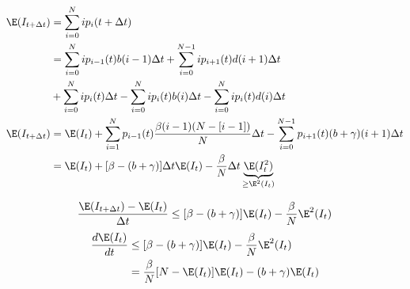 \documentclass[9pt]{beamer}
\begin{document}
    \begin{frame}{}
        \begin{align*}
            \E(I_{t + \Delta t}) &=  
                \sum_{i = 0} ^ N
                    i p_i(t + \Delta t)
            \\  
                        &=
                    \sum_{i = 0} ^ N
                        i p_{i - 1} (t) b(i - 1) \Delta t
                   + \sum_{i = 0} ^ {N-1}
                        i p_{i + 1} (t) d(i + 1) \Delta t
            \\
                & + \sum_{i=0}^N i p_i(t) \Delta t
                - \sum_{i=0}^N i p_i(t) b(i) \Delta t
                - \sum_{i=0}^N i p_i(t) d(i) \Delta t
            \\
                \E(I_{t+ \Delta t}) 
                &= 
                    \E(I_t) 
                        + \sum_{i = 1} ^ N
                        p_{i-1} (t)
                        \frac{\beta (i-1)(N - [i -1])}{N} \Delta t
                        -\sum_{i = 0} ^ {N - 1}
                        p_{i + 1} (t) (b + \gamma) (i+1) \Delta t
            \\
                &=
                \E(I_t) + [\beta - (b + \gamma )] \Delta t \E(I_t)
                -\frac{\beta}{N} \Delta t \underbrace{\E(I_t ^ 2)}_{\geq \E ^2(I_t)}
            \end{align*}

            \begin{equation*}
                \frac{\E(I_{t + \Delta t}) - \E(I_t)}{\Delta t}
                    \leq
                        [\beta  - (b + \gamma)] \E (I_t)
                        - \frac{\beta}{N} \E^2 (I_t)
            \end{equation*}
            \begin{align*}
                \frac{d \E(I_{t})}{dt}
                    & \leq
                        [\beta  - (b + \gamma)] \E (I_t)
                        - \frac{\beta}{N} \E ^ 2 (I_t)
                \\
                    & = \frac{\beta}{N} [N - \E(I_t)] \E (I_t)
                        - (b + \gamma) \E (I_t)
            \end{align*}        
    \end{frame}
\end{document}
